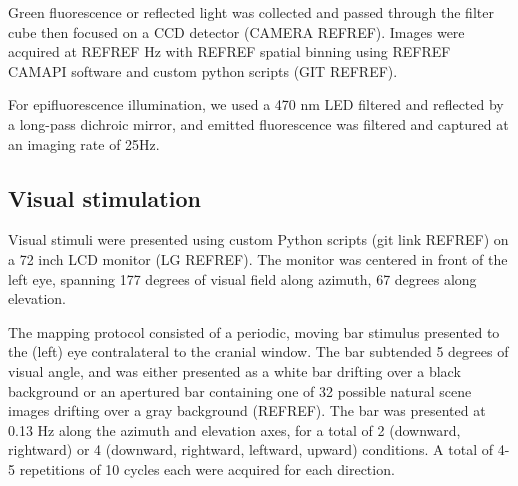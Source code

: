 Green fluorescence or reflected light was collected and passed through the filter cube then focused on a CCD detector (CAMERA REFREF). Images were acquired at REFREF Hz with REFREF spatial binning using REFREF CAMAPI software and custom python scripts (GIT REFREF). 

For epifluorescence illumination, we used a 470 nm LED filtered and reflected by a long-pass dichroic mirror, and emitted fluorescence was filtered and captured at an imaging rate of 25Hz. 


\subsection{Visual stimulation}
Visual stimuli were presented using custom Python scripts (git link REFREF) on a 72 inch LCD monitor (LG REFREF). The monitor was centered in front of the left eye, spanning 177 degrees of visual field along azimuth, 67 degrees along elevation.

The mapping protocol consisted of a periodic, moving bar stimulus \cite{Kalatsky2003, Marshel2011} presented to the (left) eye contralateral to the cranial window. The bar subtended 5 degrees of visual angle, and was either presented as a white bar drifting over a black background or an apertured bar containing one of 32 possible natural scene images drifting over a gray background (REFREF). The bar was presented at 0.13 Hz along the azimuth and elevation axes, for a total of 2 (downward, rightward) or 4 (downward, rightward, leftward, upward) conditions. A total of 4-5 repetitions of 10 cycles each were acquired for each direction. 

